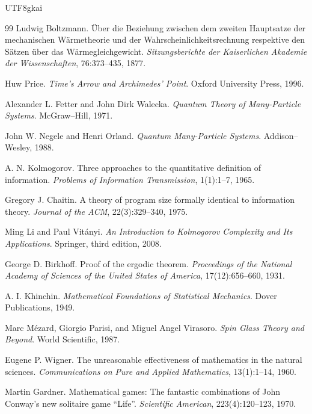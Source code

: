 \documentclass[12pt]{article}
\begin{document}
\begin{CJK*}{UTF8}{gkai}
\begin{thebibliography}{99}
Ludwig Boltzmann.
\newblock \"Uber die Beziehung zwischen dem zweiten Hauptsatze der mechanischen
W\"armetheorie und der Wahrscheinlichkeitsrechnung respektive den S\"atzen
\"uber das W\"armegleichgewicht.
\newblock \emph{Sitzungsberichte der Kaiserlichen Akademie der Wissenschaften}, 76:373--435, 1877.

Huw Price.
\newblock \emph{Time's Arrow and Archimedes' Point}.
\newblock Oxford University Press, 1996.

Alexander L. Fetter and John Dirk Walecka.
\newblock \emph{Quantum Theory of Many-Particle Systems}.
\newblock McGraw--Hill, 1971.

John W. Negele and Henri Orland.
\newblock \emph{Quantum Many-Particle Systems}.
\newblock Addison--Wesley, 1988.

A. N. Kolmogorov.
\newblock Three approaches to the quantitative definition of information.
\newblock \emph{Problems of Information Transmission}, 1(1):1--7, 1965.

Gregory J. Chaitin.
\newblock A theory of program size formally identical to information theory.
\newblock \emph{Journal of the ACM}, 22(3):329--340, 1975.

Ming Li and Paul Vit\'anyi.
\newblock \emph{An Introduction to Kolmogorov Complexity and Its Applications}.
\newblock Springer, third edition, 2008.

George D. Birkhoff.
\newblock Proof of the ergodic theorem.
\newblock \emph{Proceedings of the National Academy of Sciences of the United States of America}, 17(12):656--660, 1931.

A. I. Khinchin.
\newblock \emph{Mathematical Foundations of Statistical Mechanics}.
\newblock Dover Publications, 1949.

Marc M\'ezard, Giorgio Parisi, and Miguel Angel Virasoro.
\newblock \emph{Spin Glass Theory and Beyond}.
\newblock World Scientific, 1987.

Eugene P. Wigner.
\newblock The unreasonable effectiveness of mathematics in the natural sciences.
\newblock \emph{Communications on Pure and Applied Mathematics}, 13(1):1--14, 1960.

Martin Gardner.
\newblock Mathematical games: The fantastic combinations of John Conway's new solitaire game ``Life''.
\newblock \emph{Scientific American}, 223(4):120--123, 1970.


\end{thebibliography}
\end{CJK*}
\end{document}
